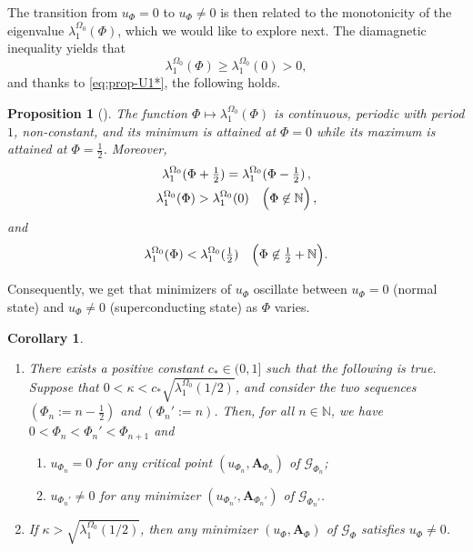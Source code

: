 \documentclass[11pt]{amsart}
\newcommand{\N}{\mathbb N}
\newcommand{\Ab}{\mathbf A}
\newcommand{\Gf}{\mathcal G_\Phi}
\newcommand{\cG}{\mathcal G}
\newtheorem{corollary}[theorem]{Corollary}
\newtheorem{proposition}[theorem]{Proposition}
\theoremstyle{definition}
\numberwithin{equation}{section}
\begin{document}
The transition from $u_\Phi=0$ to $u_\Phi\not=0$ is then related to the monotonicity of the eigenvalue $\lambda_1^{\Omega_0}(\Phi)$, which we would like to explore next.
The diamagnetic inequality yields that
\begin{equation}\label{eq:dia-mag}
\lambda_1^{\Omega_0}(\Phi) \geq \lambda_1^{\Omega_0}(0)>0,
\end{equation}
and thanks to \eqref{eq:prop-U1*}, the following holds.
%
\begin{proposition}[{\cite[Theorem~1.1]{HHOO}}]\label{prop:Hf}
The function $\Phi\mapsto\lambda_1^{\Omega_0}(\Phi)$ is continuous, periodic with period $1$,   non-constant, and its minimum is attained at $\Phi=0$  while its maximum is attained at $\Phi=\frac12$. Moreover,
\begin{equation}\label{eq:ev-flux}
\begin{gathered}
\lambda_1^{\Omega_0}(\Phi+\mbox{$\frac12$})=\lambda_1^{\Omega_0}(\Phi-\mbox{$\frac12$})\,,\\
\lambda_1^{\Omega_0}(\Phi)>\lambda_1^{\Omega_0}(0)\quad\Bigl(\Phi\not\in \N\Bigr)\,,
\end{gathered}
\end{equation}
and
\begin{equation}\label{eq:ev-max}
\lambda_1^{\Omega_0}(\Phi)<\lambda_1^{\Omega_0}(\mbox{$\frac12$})\quad\Bigl(\Phi\not\in \mbox{$\frac12$}+\N\Bigr).
\end{equation}
\end{proposition}

%
Consequently, we get that minimizers of $u_\Phi$ oscillate between $u_\Phi=0$ (normal state) and $u_\Phi\not=0$ (superconducting state) as  $\Phi$ varies.
%
\begin{corollary}\label{cor:oscillations1}~
\begin{enumerate}[\rm A)]
\item There exists a positive constant $c_*\in(0,1]$ such that the following is true. Suppose that $0<\kappa<c_*\sqrt{\lambda_1^{\Omega_0}(1/2)}$,  and consider the two sequences $(\Phi_n:=n-\frac12)$ and $(\Phi_n':=n)$. Then, for all $n\in \N$, we have $0<\Phi_n<\Phi_n'<\Phi_{n+1}$ and
\begin{enumerate}[\rm i)]
\item $u_{\Phi_n}=0$ for any critical point $(u_{\Phi_n},\Ab_{\Phi_n})$  of $\cG_{\Phi_n}$;
\item $u_{\Phi_n'}\not=0$ for any minimizer $(u_{\Phi_n'},\Ab_{\Phi_n'})$  of $\cG_{\Phi_n'}$.
\end{enumerate}
%
\item If $\kappa>\sqrt{\lambda_1^{\Omega_0}(1/2)}$, then any minimizer $(u_\Phi,\Ab_\Phi)$ of $\Gf$
satisfies $u_\Phi\not=0$.
\end{enumerate}
\end{corollary}
%
\end{document}
